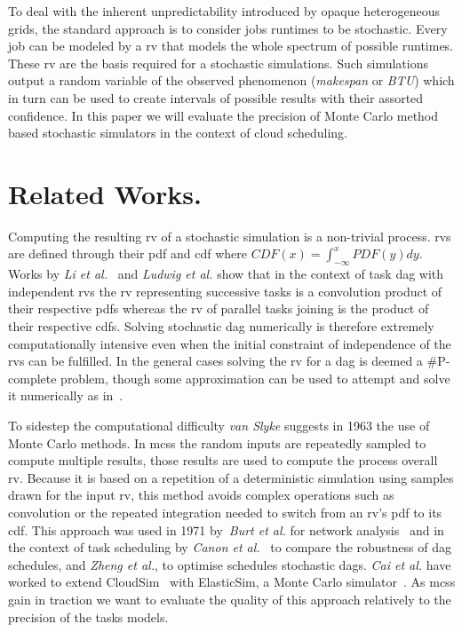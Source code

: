 \documentclass[10pt,conference,compsocconf]{IEEEtran}
\newcommand{\etal}[1]{\emph{#1 et al.}}
\begin{document}
To deal with the inherent unpredictability introduced by opaque heterogeneous
grids, the standard approach is to consider jobs runtimes to be stochastic.
Every job can be modeled by a \ac{rv} that models the whole spectrum of
possible runtimes. These \ac{rv} are the basis required for a stochastic
simulations.  Such simulations output a random variable of the observed
phenomenon (\emph{makespan} or \emph{\ac{BTU}}) which in turn can be used to
create intervals of possible results with their assorted confidence. In this
paper we will evaluate the precision of Monte Carlo method based stochastic
simulators in the context of cloud scheduling.

\section{Related Works.}

Computing the resulting \ac{rv} of a stochastic simulation is a non-trivial
process.  \acp{rv} are defined through their \ac{pdf} and \ac{cdf} where $CDF(x)
= \int_{-\infty}^{x} PDF(y) dy$. Works by \etal{Li}~\cite{Li97} and
\etal{Ludwig}\cite{Ludwig01} show that in the context of task \ac{dag} with
independent \acp{rv} the \ac{rv} representing successive tasks is a convolution
product of their respective \acp{pdf} whereas the \ac{rv} of parallel tasks
joining is the product of their respective \acp{cdf}. Solving stochastic
\ac{dag} numerically is therefore extremely computationally intensive even when
the initial constraint of independence of the \acp{rv} can be fulfilled. In the
general cases solving the \ac{rv} for a \ac{dag} is deemed a \#P-complete
problem, though some approximation can be used to attempt and solve it
numerically as in~\cite{dodin85}.

To sidestep the computational difficulty \emph{van Slyke} suggests in
1963\cite{Slyke63} the use of Monte Carlo methods. In \acp{mcs} the random
inputs are repeatedly sampled to compute multiple results, those results are
used to compute the process overall \acl{rv}. Because it is based on a
repetition of a deterministic simulation using samples drawn for the input
\ac{rv}, this method avoids complex operations such as convolution or the
repeated integration needed to switch from an \ac{rv}'s \ac{pdf} to its
\ac{cdf}. This approach was used in 1971 by~\etal{Burt} for network
analysis~\cite{burt71} and in the context of task scheduling by
\etal{Canon}~\cite{Canon10} to compare the robustness of \ac{dag} schedules, and
\etal{Zheng}, to optimise schedules stochastic \acp{dag}. \etal{Cai} have worked
to extend CloudSim~\cite{cloudsim} with ElasticSim, a Monte Carlo
simulator~\cite{cai16}. As \acp{mcs} gain in traction we want to
evaluate the quality of this approach relatively to the precision of the tasks
models.
\end{document}

